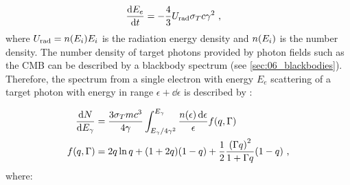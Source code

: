 \begin{equation}
    \begin{aligned}
    \dv{E_e}{t}&=-\frac{4}{3}U_\text{rad}\sigma_T c\gamma^2 \text{ ,}
    \end{aligned}   \label{eq:chapter_1_non_thermal_IC_e_energy_lost}
\end{equation}
\noindent where $U_\text{rad}=n\qty(E_i)E_i$ is the radiation energy density and $n\qty(E_i)$ is the number density.
\newpar
The number density of target photons provided by photon fields such as the CMB can be described by a blackbody spectrum (see \autoref{sec:06_blackbodies}). Therefore, the spectrum from a single electron with energy $E_e$ scattering of a target photon with energy in range $\epsilon + \dd{\epsilon}$ is described by \citep{RevModPhys.42.237}:

\begin{equation}
    \begin{aligned}
        \frac{\dd{N}}{\dd{E_\gamma}}&=\frac{3\sigma_T mc^3}{4\gamma}\int_{E_\gamma/4\gamma^2}^{E_\gamma}\frac{n\qty(\epsilon)\dd{\epsilon}}{\epsilon}f\qty(q,\Gamma) \\
        f\qty(q,\Gamma)&=2q\ln q +\qty(1+2q)\qty(1-q)+\frac{1}{2}\frac{\qty(\Gamma q)^2}{1+\Gamma q}\qty(1-q)\text{ ,}
    \end{aligned} \label{eq:01_nonthermal_IC_indiv_spectral}
\end{equation}
\noindent where:

